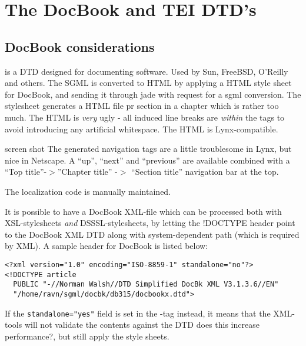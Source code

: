
\chapter{The DocBook and TEI DTD's}


\section{DocBook considerations}


\textsf{ is a DTD designed for
documenting software.  Used by Sun, FreeBSD, O'Reilly and others.
}
\textsf{
The SGML is converted to HTML by applying a HTML style sheet for
DocBook, and sending it through jade with request for a sgml
conversion.  The stylesheet generates a HTML file pr section in a
chapter which is rather too much.  The HTML is \textit{very} ugly - all
induced line breaks are \textit{within} the tags to avoid introducing any
artificial whitespace.  The HTML is Lynx-compatible.
}

\textsf{screen shot}
The generated navigation tags are a little troublesome in Lynx, but
nice in Netscape.  A ``up'', ``next'' and ``previous'' are available
combined with a ``Top title''-$>$''Chapter title'' -$>$ ``Section title''
navigation bar at the top.

The localization code is manually maintained.

It is possible to have a DocBook XML-file which can be processed both
with XSL-stylesheets \textit{and} DSSSL-stylesheets, by letting the
!DOCTYPE header point to the DocBook XML DTD along with
system-dependent path (which is required by XML).  A sample header for
DocBook is listed below:

\begin{verbatim}
<?xml version="1.0" encoding="ISO-8859-1" standalone="no"?>
<!DOCTYPE article 
  PUBLIC "-//Norman Walsh//DTD Simplified DocBk XML V3.1.3.6//EN" 
  "/home/ravn/sgml/docbk/db315/docbookx.dtd">
\end{verbatim}

If the \texttt{standalone="yes"} field is set in the -tag
instead, it means that the XML-tools will not validate the contents
against the DTD \textsf{does this increase performance?}, but still
apply the style sheets.

